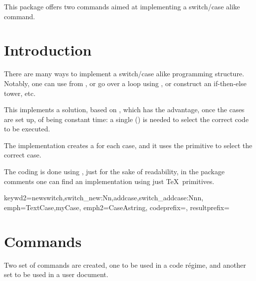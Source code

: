 \documentclass[10pt]{article}
\begin{document}
  

\begin{typesetabstract}
 
This package offers two commands aimed at implementing a switch/case alike command.
\end{typesetabstract}

\tableofcontents

\section{Introduction}
There are many ways to implement a switch/case alike programming structure. Notably, one can use  from , or go over a loop using \tsobj{\pdfstrcmp}, or construct an if-then-else tower, etc.

This implements a solution, based on  \cite{stackexchage:switchcase}, which has the advantage, once the cases are set up, of being constant time: a single (\tsobj{\ifcsname}) is needed to select the correct code to be executed. 



\begin{tsremark}
  The implementation creates a \tsobj{\csname} for each case, and it uses the primitive \tsobj{\ifcsname} to select the correct case.
\end{tsremark}
\begin{tsremark}
  The coding is done using , just for the sake of readability, in the package comments one can find an implementation using just \TeX\  primitives.
\end{tsremark}

  {
    keywd2={newswitch,switch_new:Nn,addcase,switch_addcase:Nnn},
    emph={TextCase,myCase},
    emph2={CaseAstring},
    codeprefix={},
    resultprefix={}
  }


\section{Commands}
Two set of commands are created, one to be used in a  code régime, and another set to be used in a user document.
\end{document}
